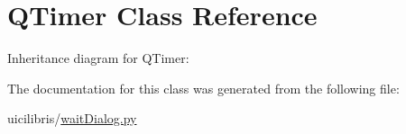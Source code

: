 \hypertarget{classQTimer}{\section{\-Q\-Timer \-Class \-Reference}
\label{classQTimer}
}


\-Inheritance diagram for \-Q\-Timer\-:


\-The documentation for this class was generated from the following file\-:\begin{DoxyCompactItemize}
\item 
uicilibris/\hyperlink{waitDialog_8py}{wait\-Dialog.\-py}\end{DoxyCompactItemize}
